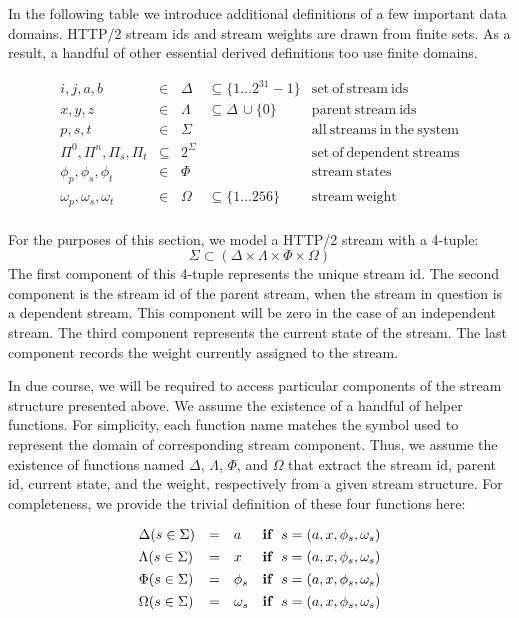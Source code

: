 \documentclass[10pt]{article}
\begin{document}
In the following table we introduce additional definitions of a few important data domains. HTTP/2 stream ids and stream weights are drawn from finite sets. As a result, a handful of other essential derived definitions too use finite domains.

\[
\begin{array}{rllll}
i, j, a, b &\in &\Delta & \subseteq \{ 1 \ldots 2^{31}-1 \} & \mathrm{set\ of \ stream \ ids}\\
x, y, z &\in&\Lambda & \subseteq \Delta \, \cup \{ 0 \} & \mathrm{parent \ stream \ ids}\\
p, s, t & \in &\Sigma &   &\mathrm{all \ streams \ in \ the \ system}\\
\Pi^0, \Pi^n, \Pi_{s}, \Pi_{t}&\subseteq&2^{\Sigma}&&\mathrm{set \ of \ dependent \ streams }\\
\phi_{p}, \phi_{s}, \phi_{t} &\in & \Phi &  &\mathrm{stream \ states}\\
\omega_{p}, \omega_{s}, \omega_{t} &\in &\Omega &  \subseteq \{1 \ldots 256\} &\mathrm{stream \ weight}\\
\end{array}
\]

For the purposes of this section, we model a HTTP/2 stream with a 4-tuple:
\[
    \Sigma \subset (\Delta \times \Lambda \times \Phi \times \Omega)
\]
The first component of this 4-tuple represents the unique stream id. The second component is the stream id of the parent stream, when the stream in question is a dependent stream. This component will be zero in the case of an independent stream. The third component represents the current state of the stream. The last component records the weight currently assigned to the stream.

In due course, we will be required to access particular components of the stream structure presented above. We assume the existence of a handful of helper functions. For simplicity, each function name matches the symbol used to represent the domain of corresponding stream component. Thus, we assume the existence of functions named $\Delta$, $\Lambda$, $\Phi$, and $\Omega$ that extract the stream id, parent id, current state, and the weight, respectively from a given stream structure. For completeness, we provide the trivial definition of these four functions here:

\[
\begin{array}{llll}
    \Delta(s \in \Sigma) &=& a & \mathbf{if} \;\; s = (a, x, \phi_{s}, \omega_{s})
    \vspace*{4pt}\\
    \Lambda(s \in \Sigma) &=& x & \mathbf{if} \;\; s = (a, x, \phi_{s}, \omega_{s})
    \vspace*{4pt}\\
    \Phi(s \in \Sigma) &=& \phi_{s} & \mathbf{if} \;\; s = (a, x, \phi_{s}, \omega_{s})
    \vspace*{4pt}\\
    \Omega(s \in \Sigma) &=& \omega_{s}  & \mathbf{if} \;\; s = (a, x, \phi_{s}, \omega_{s})
    \vspace*{4pt}\\
\end{array}
\]
\end{document}
